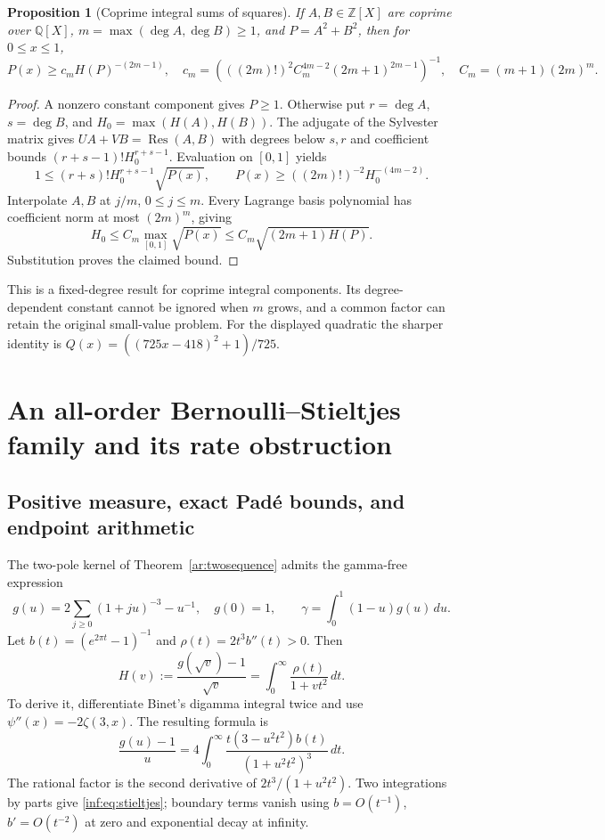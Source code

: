 \documentclass[11pt,a4paper]{article}
\newcommand{\Q}{\mathbb Q}
\newcommand{\Z}{\mathbb Z}
\newtheorem{proposition}[theorem]{Proposition}
\theoremstyle{definition}
\theoremstyle{remark}
\numberwithin{equation}{section}
\begin{document}
\begin{proposition}[Coprime integral sums of squares]\label{inf:prop:sos}
If $A,B\in\Z[X]$ are coprime over $\Q[X]$, $m=\max(\deg A,\deg B)\ge1$, and $P=A^2+B^2$, then for $0\le x\le1$,
\[
 P(x)\ge c_mH(P)^{-(2m-1)},
 \quad c_m=\left(((2m)!)^2C_m^{4m-2}(2m+1)^{2m-1}\right)^{-1},
 \quad C_m=(m+1)(2m)^m.
\]
\end{proposition}
\begin{proof}
A nonzero constant component gives $P\ge1$. Otherwise put $r=\deg A$, $s=\deg B$, and $H_0=\max(H(A),H(B))$. The adjugate of the Sylvester matrix gives $UA+VB=\operatorname{Res}(A,B)$ with degrees below $s,r$ and coefficient bounds $(r+s-1)!H_0^{r+s-1}$. Evaluation on $[0,1]$ yields
\[
 1\le(r+s)!H_0^{r+s-1}\sqrt{P(x)},
 \qquad P(x)\ge((2m)!)^{-2}H_0^{-(4m-2)}.
\]
Interpolate $A,B$ at $j/m$, $0\le j\le m$. Every Lagrange basis polynomial has coefficient norm at most $(2m)^m$, giving
\[
 H_0\le C_m\max_{[0,1]}\sqrt{P(x)}
      \le C_m\sqrt{(2m+1)H(P)}.
\]
Substitution proves the claimed bound.
\end{proof}
This is a fixed-degree result for coprime integral components. Its degree-dependent constant cannot be ignored when $m$ grows, and a common factor can retain the original small-value problem. For the displayed quadratic the sharper identity is $Q(x)=((725x-418)^2+1)/725$.

\section{An all-order Bernoulli--Stieltjes family and its rate obstruction}
\label{inf:sec:pade}
\subsection{Positive measure, exact Pad\'e bounds, and endpoint arithmetic}
\label{inf:sub:pade}
The two-pole kernel of Theorem~\ref{ar:twosequence} admits the gamma-free expression
\[
 g(u)=2\sum_{j\ge0}(1+ju)^{-3}-u^{-1},\quad g(0)=1,
 \qquad\gamma=\int_0^1(1-u)g(u)\,du.
\]
Let $b(t)=(e^{2\pi t}-1)^{-1}$ and $\rho(t)=2t^3b''(t)>0$. Then
\begin{equation}\label{inf:eq:stieltjes}
 H(v):=\frac{g(\sqrt v)-1}{\sqrt v}
       =\int_0^\infty\frac{\rho(t)}{1+vt^2}\,dt.
\end{equation}
To derive it, differentiate Binet's digamma integral \cite[5.9.10]{inf:DLMFGamma} twice and use $\psi''(x)=-2\zeta(3,x)$. The resulting formula is
\[
 \frac{g(u)-1}{u}=4\int_0^\infty
        \frac{t(3-u^2t^2)b(t)}{(1+u^2t^2)^3}\,dt.
\]
The rational factor is the second derivative of $2t^3/(1+u^2t^2)$. Two integrations by parts give \eqref{inf:eq:stieltjes}; boundary terms vanish using $b=O(t^{-1})$, $b'=O(t^{-2})$ at zero and exponential decay at infinity.
\end{document}
